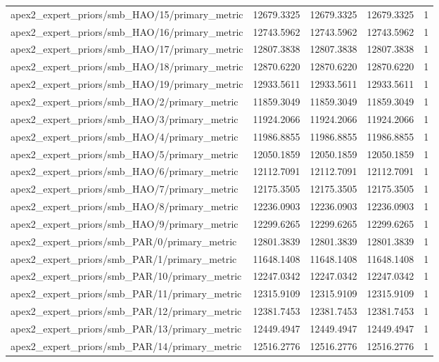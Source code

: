 \begin{table}[h]
\begin{tabular}{lrrrr}
apex2_expert_priors/smb_HAO/15/primary_metric & 12679.3325 & 12679.3325 & 12679.3325 & 1 \\
apex2_expert_priors/smb_HAO/16/primary_metric & 12743.5962 & 12743.5962 & 12743.5962 & 1 \\
apex2_expert_priors/smb_HAO/17/primary_metric & 12807.3838 & 12807.3838 & 12807.3838 & 1 \\
apex2_expert_priors/smb_HAO/18/primary_metric & 12870.6220 & 12870.6220 & 12870.6220 & 1 \\
apex2_expert_priors/smb_HAO/19/primary_metric & 12933.5611 & 12933.5611 & 12933.5611 & 1 \\
apex2_expert_priors/smb_HAO/2/primary_metric & 11859.3049 & 11859.3049 & 11859.3049 & 1 \\
apex2_expert_priors/smb_HAO/3/primary_metric & 11924.2066 & 11924.2066 & 11924.2066 & 1 \\
apex2_expert_priors/smb_HAO/4/primary_metric & 11986.8855 & 11986.8855 & 11986.8855 & 1 \\
apex2_expert_priors/smb_HAO/5/primary_metric & 12050.1859 & 12050.1859 & 12050.1859 & 1 \\
apex2_expert_priors/smb_HAO/6/primary_metric & 12112.7091 & 12112.7091 & 12112.7091 & 1 \\
apex2_expert_priors/smb_HAO/7/primary_metric & 12175.3505 & 12175.3505 & 12175.3505 & 1 \\
apex2_expert_priors/smb_HAO/8/primary_metric & 12236.0903 & 12236.0903 & 12236.0903 & 1 \\
apex2_expert_priors/smb_HAO/9/primary_metric & 12299.6265 & 12299.6265 & 12299.6265 & 1 \\
apex2_expert_priors/smb_PAR/0/primary_metric & 12801.3839 & 12801.3839 & 12801.3839 & 1 \\
apex2_expert_priors/smb_PAR/1/primary_metric & 11648.1408 & 11648.1408 & 11648.1408 & 1 \\
apex2_expert_priors/smb_PAR/10/primary_metric & 12247.0342 & 12247.0342 & 12247.0342 & 1 \\
apex2_expert_priors/smb_PAR/11/primary_metric & 12315.9109 & 12315.9109 & 12315.9109 & 1 \\
apex2_expert_priors/smb_PAR/12/primary_metric & 12381.7453 & 12381.7453 & 12381.7453 & 1 \\
apex2_expert_priors/smb_PAR/13/primary_metric & 12449.4947 & 12449.4947 & 12449.4947 & 1 \\
apex2_expert_priors/smb_PAR/14/primary_metric & 12516.2776 & 12516.2776 & 12516.2776 & 1 \\

\end{tabular}
\end{table}
